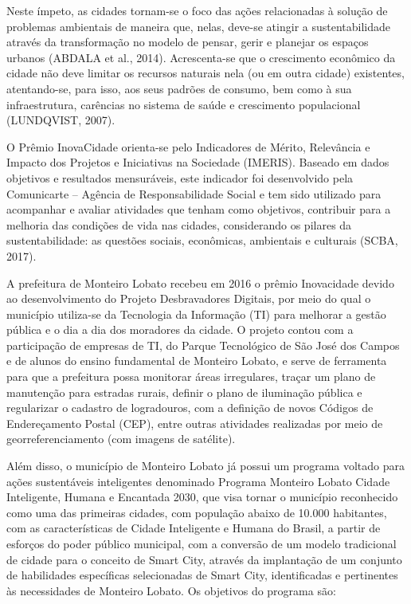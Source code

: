 	Neste ímpeto, as cidades tornam-se o foco das ações relacionadas à solução de problemas ambientais de maneira que, nelas, deve-se atingir a sustentabilidade através da transformação no modelo de pensar, gerir e planejar os espaços urbanos (ABDALA et al., 2014). Acrescenta-se que o crescimento econômico da cidade não deve limitar os recursos naturais nela (ou em outra cidade) existentes, atentando-se, para isso, aos seus padrões de consumo, bem como à sua infraestrutura, carências no sistema de saúde e crescimento populacional (LUNDQVIST, 2007).
	
	O Prêmio InovaCidade orienta-se pelo Indicadores de Mérito, Relevância e Impacto dos Projetos e Iniciativas na Sociedade (IMERIS). Baseado em dados objetivos e resultados mensuráveis, este indicador foi desenvolvido pela Comunicarte – Agência de Responsabilidade Social e tem sido utilizado para acompanhar e avaliar atividades que tenham como objetivos, contribuir para a melhoria das condições de vida nas cidades, considerando os pilares da sustentabilidade: as questões sociais, econômicas, ambientais e culturais (SCBA, 2017).
	
	A prefeitura de Monteiro Lobato recebeu em 2016 o prêmio Inovacidade devido ao desenvolvimento do Projeto Desbravadores Digitais, por meio do qual o município utiliza-se da Tecnologia da Informação (TI) para melhorar a gestão pública e o dia a dia dos moradores da cidade. O projeto contou com a participação de empresas de TI, do Parque Tecnológico de São José dos Campos e de alunos do ensino fundamental de Monteiro Lobato, e serve de ferramenta para que a prefeitura possa monitorar áreas irregulares, traçar um plano de manutenção para estradas rurais, definir o plano de iluminação pública e regularizar o cadastro de logradouros, com a definição de novos Códigos de Endereçamento Postal (CEP), entre outras atividades realizadas por meio de georreferenciamento (com imagens de satélite).
	
	Além disso, o município de Monteiro Lobato já possui um programa voltado para ações sustentáveis inteligentes denominado Programa Monteiro Lobato Cidade Inteligente, Humana e Encantada 2030, que visa tornar o município reconhecido como uma das primeiras cidades, com população abaixo de 10.000 habitantes, com as características de Cidade Inteligente e Humana do Brasil, a partir de esforços do poder público municipal, com a conversão de um modelo tradicional de cidade para o conceito de Smart City, através da implantação de um conjunto de habilidades específicas selecionadas de Smart City, identificadas e pertinentes às necessidades de Monteiro Lobato. Os objetivos do programa são:
	
